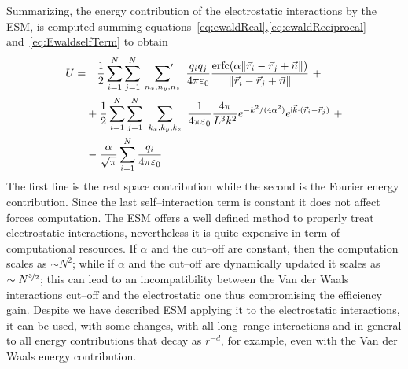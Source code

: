 Summarizing, the energy contribution of the electrostatic interactions by the \ac{ESM}, is computed summing equations~\eqref{eq:ewaldReal},\eqref{eq:ewaldReciprocal} and~\eqref{eq:EwaldselfTerm} to obtain
\begin{equation}
	\begin{aligned}
		U =&\quad\frac{1}{2}\sum_{i=1}^N\sum_{j=1}^N\ \sideset{}{'}\sum_{n_x,n_y,n_z}\ \frac{q_iq_j}{4 \pi \varepsilon_0} \frac{\erfc{(\alpha \| \vec r_i - \vec r_j + \vec n \|)}}{\| \vec r_i - \vec r_j + \vec n \|}\ + \\
		 &+ \frac{1}{2}\sum_{i=1}^N\sum_{j=1}^N\ \sum_{k_x,k_y,k_z}\  \frac{1}{4\pi\varepsilon_0}\frac{4\pi}{L^3k^2}e^{-k^2/(4\alpha^2)}e^{\mathsf{i}{\vec k \cdot (\vec r_i - \vec r_j)}}\ + \\
		 &- \frac{\alpha}{\sqrt{\pi}}\sum_{i=1}^N\frac{q_i}{4\pi\varepsilon_0}
	\end{aligned}
	\label{eq:EwaldEnergy}
\end{equation}
The first line is the real space contribution while the second is the Fourier energy contribution. Since the last self--interaction term is constant it does not affect forces computation. The \ac{ESM} offers a well defined method to properly treat electrostatic interactions, nevertheless it is quite expensive in term of computational resources. If $\alpha$ and the cut--off are constant, then the computation scales as $\sim N^2$; while if $\alpha$ and the cut--off are dynamically updated it scales as $\sim N^{\nicefrac{3}{2}}$; this can lead to an incompatibility between the Van der Waals interactions cut--off and the electrostatic one thus compromising the efficiency gain. Despite we have described \ac{ESM} applying it to the electrostatic interactions, it can be used, with some changes, with all long--range interactions and in general to all energy contributions that decay as $r^{-d}$, for example, even with the Van der Waals energy contribution.

